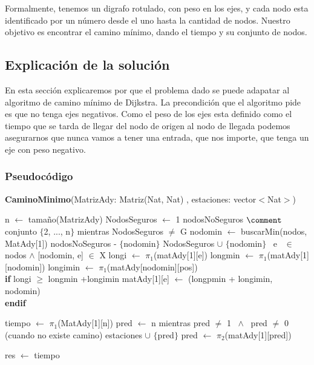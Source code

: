 \documentclass[spanish,12pt]{article}
\begin{document}
Formalmente, tenemos un digrafo rotulado, con peso en los ejes, y cada nodo esta identificado por un número desde el uno hasta la cantidad de nodos. Nuestro objetivo es encontrar el camino mínimo, dando el tiempo y su conjunto de nodos.


\subsection{Explicación de la solución}

   En esta sección explicaremos por que el problema dado se puede adapatar al algoritmo de camino mínimo de Dijkstra.
 La precondición que el algoritmo pide es que no tenga ejes negativos. Como el peso de los ejes esta definido como el tiempo que se tarda de llegar del nodo de origen al nodo de llegada podemos asegurarnos que nunca vamos a tener una entrada, que nos importe, que tenga un eje con peso negativo. 

\subsubsection{Pseudocódigo}

\begin{algorithm}[H]{\textbf{CaminoMinimo}(MatrizAdy: Matriz(Nat, Nat) , estaciones: vector$<$Nat$>$)}
	\begin{algorithmic}[1]
		
		\State n $\gets$ tamaño(MatrizAdy)
		\State NodosSeguros $\gets$ 1
		\State nodosNoSeguros $\comment$ conjunto $\{$2, ..., n$\}$
		\State mientras NodosSeguros $\neq$ G
		\State \quad nodomin $\gets$ buscarMin(nodos, MatAdy[1])
		\State \quad nodosNoSeguros - $\{$nodomin$\}$
		\State \quad NodosSeguros $\cup$ $\{$nodomin$\}$
		\State \quad \forall \ e \ $\in$ nodos $\land$ [nodomin, e] $\in$ X
		\State \qquad longi $\gets$ $\pi_{1}$(matAdy[1][e])
		\State \qquad longmin $\gets$ $\pi_{1}$(matAdy[1][nodomin])
		\State \qquad longimin $\gets$ $\pi_{1}$(matAdy[nodomin][pos])
\\
		\qquad \textbf{if} longi $\geq$ longmin +longimin
			\State \qquad \quad matAdy[1][e] $\gets$ (longpmin + longimin, nodomin)
\\		 
 \qquad \textbf{endif}

		\State tiempo $\gets$ $\pi_{1}$(MatAdy[1][n])
		\State pred $\gets$ n
		\State mientras pred $\neq$ 1 \ $\land$ \ pred $\neq$ 0 (cuando no existe camino)
		\State \quad estaciones $\cup$ $\{$pred$\}$
		\State \quad pred $\gets$ $\pi_{2}$(matAdy[1][pred])

		\State res $\gets$ tiempo
 	\end{algorithmic}
\end{algorithm}
\end{document}
